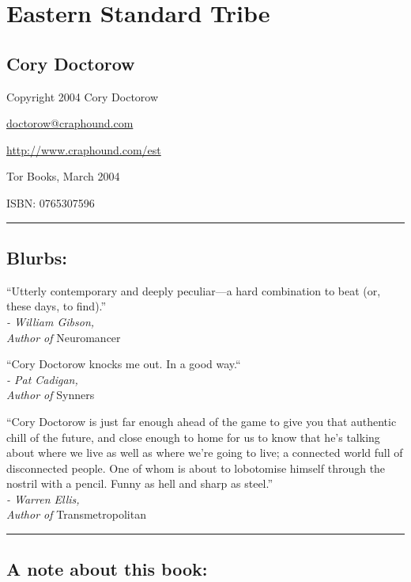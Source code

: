 \section{Eastern Standard Tribe}

\subsection{Cory Doctorow}

Copyright 2004 Cory Doctorow

\href{mailto:doctorow@craphound.com}{doctorow@craphound.com}

\href{http://www.craphound.com/est}{http://www.craphound.com/est}

Tor Books, March 2004

ISBN: 0765307596

\begin{center}\rule{3in}{0.4pt}\end{center}

\subsection{Blurbs:}

“Utterly contemporary and deeply peculiar—a hard combination to
beat (or, these days, to
find).”\\\emph{- William Gibson,\\Author of} Neuromancer

“Cory Doctorow knocks me out. In a good way.“\\
\emph{- Pat Cadigan,\\Author of} Synners

“Cory Doctorow is just far enough ahead of the game to give you
that authentic chill of the future, and close enough to home for us
to know that he’s talking about where we live as well as where
we’re going to live; a connected world full of disconnected people.
One of whom is about to lobotomise himself through the nostril with
a pencil. Funny as hell and sharp as
steel.”\\\emph{- Warren Ellis,\\Author of} Transmetropolitan

\begin{center}\rule{3in}{0.4pt}\end{center}

\subsection{A note about this book:}


